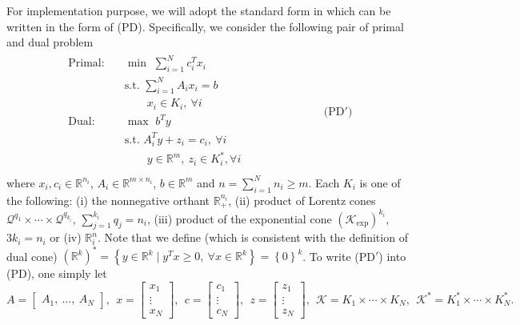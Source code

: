 \documentclass[10pt]{article}
\theoremstyle{definition}
\theoremstyle{plain}
\begin{document}
For implementation purpose, we will adopt the standard form in \cite{SDPT3_2010} which can be written in the form of (PD). Specifically, we consider the following pair of primal and dual problem
\begin{align*}
\begin{split}
\text{Primal:}\quad &\min\,\, \sum_{i=1}^N c_i^Tx_i\\
& \text{s.t.}\,\, \sum_{i=1}^N A_i x_i = b \\
&\quad\quad x_i \in K_i,\ \forall i \\[1ex] 
\text{Dual:} \quad &\max\,\, b^T y\\
& \text{s.t.}\,\, A_i^T y + z_i = c_i, \ \forall i \\
&\quad\quad y \in \mathbb{R}^m,\ z_i \in K_i^*, \forall i \\[1ex]
\end{split} \quad\quad\quad\quad\quad\quad\quad \text{(PD$'$)}
\end{align*}
where $x_i, c_i \in \mathbb{R}^{n_i}$, $A_i \in \mathbb{R}^{m\times n_i}$, $b \in \mathbb{R}^m$ and $n = \sum_{i=1}^N n_i \geq m$. Each $K_i$ is one of the following: (i) the nonnegative orthant $\mathbb{R}_+^{n_i}$, (ii) product of Lorentz cones $\mathcal{Q}^{q_1}\times \cdots \times \mathcal{Q}^{q_{k_i}}$, $\sum_{j=1}^{k_i} q_j = n_i$, (iii) product of the exponential cone  $\left(\mathcal{K}_{\exp}\right)^{k_i}$, $3k_i = n_i$ or (iv) $\mathbb{R}^n_i$. Note that we define (which is consistent with the definition of dual cone) $\left(\mathbb{R}^k\right)^* = \left\{ y \in \mathbb{R}^k \mid y^T x \geq 0,\ \forall x \in \mathbb{R}^k  \right\} = \left\{0\right\}^k$. To write (PD$'$) into (PD), one simply let
\[  A = \begin{bmatrix} A_1,\ \hdots,\  A_N \end{bmatrix},\ \
x = \begin{bmatrix} x_1 \\ \vdots\\ x_N \end{bmatrix},\ \ 
c = \begin{bmatrix} c_1 \\ \vdots \\c_N \end{bmatrix},\ \
z = \begin{bmatrix} z_1 \\ \vdots \\ z_N \end{bmatrix},\ \ \mathcal{K} = K_1 \times \cdots \times K_N,\ \ \mathcal{K}^* = K_1^* \times \cdots \times K_N^*.\]
\end{document}
